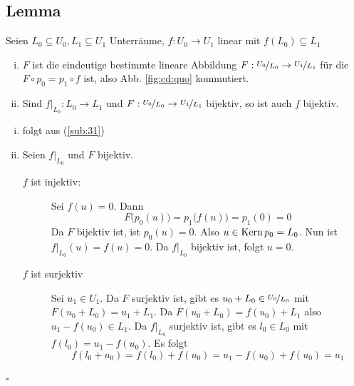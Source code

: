 \subsection[Lemma über Eigenschaften der induzierten Abbildung]{Lemma} %
\label{sub:38}
Seien $L_0 \subseteq U_0 , L_1 \subseteq U_1$ Unterräume, $f : U_0 \to U_1$ linear mit $f(L_0) \subseteq L_1$
\begin{enumerate}[i)]
	\item $F$ ist die eindeutige bestimmte lineare Abbildung $F : \nicefrac{U_0}{L_0} \to \nicefrac{U_1}{L_1}$ für die $F \circ p_0 = p_1 \circ f$ ist, also
	Abb. \ref{fig:cd:quo} kommutiert.
	\begin{figure}[h]
	\end{figure}
	\item Sind $f|_{L_0} : L_0 \to L_1$ und $F : \nicefrac{U_0}{L_0} \to \nicefrac{U_1}{L_1}$ bijektiv, so ist auch $f$ bijektiv.
\end{enumerate}
\begin{enumerate}[i)]
	\item folgt aus (\ref{sub:31})
	\item Seien $f|_{L_0}$ und $F$ bijektiv. 
	\begin{description}
		\item[$f$ ist injektiv:] Sei $f(u)=0$. Dann 
		\[
			F \big(p_0(u)\big)= p_1 \big(f(u)\big) = p_1 (0) = 0
		\]
		Da $F$ bijektiv ist, ist $p_0(u)=0$. Also $u \in \operatorname{Kern} p_0= L_0$. Nun ist $f|_{L_0} (u)= f(u)= 0$. Da $f|_{L_0}$ bijektiv ist, folgt $u=0$.
		\item[$f$ ist surjektiv] Sei $u_1 \in U_1$. Da $F$ surjektiv ist, gibt es $u_0+L_0 \in \nicefrac{U_0}{L_0}$ mit $F(u_0 + L_0) = u_1 + L_1$.
		Da $F(u_0 + L_0)= f(u_0) + L_1$ also $u_1 -f(u_0) \in L_1$. Da $f|_{L_0}$ surjektiv ist, gibt es $l_0 \in L_0$ mit $f(l_0)= u_1 - f(u_0)$.
		Es folgt 
		\[
			f(l_0 + u_0) = f(l_0) +f(u_0) = u_1 - f(u_0)+ f(u_0) = u_1
		\]
	\end{description}
\end{enumerate}
\hfill \( \square \)

